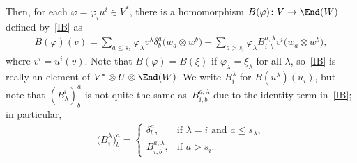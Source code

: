 Then, for each $\varphi=\varphi_i u^i \in V^*$, there is a homomorphism $B(\varphi)\colon V \to
\End(W)$ def\/ined by~\eqref{IB} as
\begin{gather*}
B(\varphi)(v) =
\sum_{a \leq s_\lambda}
\varphi_\lambda v^\lambda \delta^a_b \big(w_a \otimes w^b\big) +
\sum_{a>s_i} \varphi_\lambda B^{a,\lambda}_{i,b} v^i \big(w_a \otimes w^b\big),
\label{IBphi}
\end{gather*}
where $v^i = u^i(v)$.  Note that $B(\varphi) = B(\xi)$ if $\varphi_\lambda = \xi_\lambda$ for all
$\lambda$, so~\eqref{IB} is really an element of $V^* \otimes U \otimes
\End(W)$.
We write $B^\lambda_i$ for $B(u^\lambda)(u_i)$, but note that
$(B_\lambda^i)^a_b$ is not
quite the same as~$B^{a,\lambda}_{i,b}$  due to the identity term in~\eqref{IB}; in particular,
\begin{gather*}
\big(B^\lambda_i\big)^a_b =
\begin{cases}
\delta^a_b, & \text{if $\lambda=i$ and $a \leq s_\lambda$},\\
B^{a,\lambda}_{i,b}, & \text{if $a>s_i$}.
\end{cases}
\label{IBcomp}
\end{gather*}

